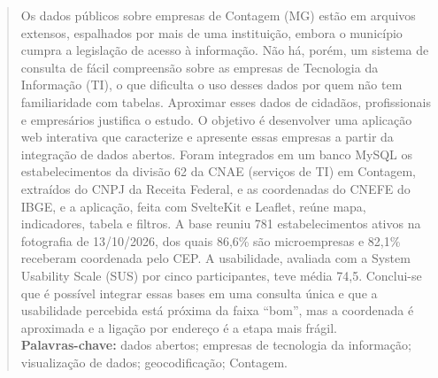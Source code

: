 \documentclass[a4paper,12pt]{article}
\newcommand{\keyword}[1]{\textsf{#1}}
\begin{document}
\begin{abstract}
\noindent
Os dados públicos sobre empresas de Contagem (MG) estão em arquivos extensos, espalhados por mais de uma instituição, embora o município cumpra a legislação de acesso à informação. Não há, porém, um sistema de consulta de fácil compreensão sobre as empresas de Tecnologia da Informação (TI), o que dificulta o uso desses dados por quem não tem familiaridade com tabelas. Aproximar esses dados de cidadãos, profissionais e empresários justifica o estudo. O objetivo é desenvolver uma aplicação web interativa que caracterize e apresente essas empresas a partir da integração de dados abertos. Foram integrados em um banco MySQL os estabelecimentos da divisão 62 da CNAE (serviços de TI) em Contagem, extraídos do CNPJ da Receita Federal, e as coordenadas do CNEFE do IBGE, e a aplicação, feita com SvelteKit e Leaflet, reúne mapa, indicadores, tabela e filtros. A base reuniu 781 estabelecimentos ativos na fotografia de 13/10/2026, dos quais 86,6\% são microempresas e 82,1\% receberam coordenada pelo CEP. A usabilidade, avaliada com a System Usability Scale (SUS) por cinco participantes, teve média 74,5. Conclui-se que é possível integrar essas bases em uma consulta única e que a usabilidade percebida está próxima da faixa ``bom'', mas a coordenada é aproximada e a ligação por endereço é a etapa mais frágil.
\\\textbf{\keyword{Palavras-chave:}} dados abertos; empresas de tecnologia da informação; visualização de dados; geocodificação; Contagem.
\end{abstract}
\end{document}
